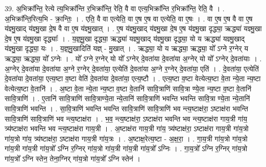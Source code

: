 \documentclass[17pt]{extarticle}
\begin{document}
39. अ॒भिक्रा᳚न्ति॒ रेत्ये त्य॒भिक्रा᳚न्ति र॒भिक्रा᳚न्ति॒ रेति॒ वै वा एत्य॒भिक्रा᳚न्ति र॒भिक्रा᳚न्ति॒ रेति॒ वै । . अ॒भिक्रा᳚न्ति॒रित्य॒भि - क्रा॒न्तिः॒ । . एति॒ वै वा एत्येति॒ वा ए॒ष ए॒ष वा एत्येति॒ वा ए॒षः । . वा ए॒ष ए॒ष वै वा ए॒ष य॑ज्ञ्मु॒खाद् य॑ज्ञ्मु॒खा दे॒ष वै वा ए॒ष य॑ज्ञ्मु॒खात् । . ए॒ष य॑ज्ञ्मु॒खाद् य॑ज्ञ्मु॒खा दे॒ष ए॒ष य॑ज्ञ्मु॒खा दृद्ध्या॒ ऋद्ध्या॑ यज्ञ्मु॒खा दे॒ष ए॒ष य॑ज्ञ्मु॒खा दृद्ध्याः᳚ । . य॒ज्ञ्॒मु॒खा दृद्ध्या॒ ऋद्ध्या॑ यज्ञ्मु॒खाद् य॑ज्ञ्मु॒खा दृद्ध्या॒ यो य ऋद्ध्या॑ यज्ञ्मु॒खाद् य॑ज्ञ्मु॒खा दृद्ध्या॒ यः । . य॒ज्ञ्॒मु॒खादिति॑ यज्ञ् - मु॒खात् । . ऋद्ध्या॒ यो य ऋद्ध्या॒ ऋद्ध्या॒ यो᳚ ऽग्ने र॒ग्नेर् य ऋद्ध्या॒ ऋद्ध्या॒ यो᳚ ऽग्नेः । . यो᳚ ऽग्ने र॒ग्नेर् यो यो᳚ ऽग्नेर् दे॒वता॑या दे॒वता॑या अ॒ग्नेर् यो यो᳚ ऽग्नेर् दे॒वता॑याः । . अ॒ग्नेर् दे॒वता॑या दे॒वता॑या अ॒ग्ने र॒ग्नेर् दे॒वता॑या॒ एत्येति॑ दे॒वता॑या अ॒ग्ने र॒ग्नेर् दे॒वता॑या॒ एति॑ । . दे॒वता॑या॒ एत्येति॑ दे॒वता॑या दे॒वता॑या॒ एत्य॒ष्टा व॒ष्टा वेति॑ दे॒वता॑या दे॒वता॑या॒ एत्य॒ष्टौ । . एत्य॒ष्टा व॒ष्टा वेत्येत्य॒ष्टा वे॒ता न्ये॒ता न्य॒ष्टा वेत्येत्य॒ष्टा वे॒तानि॑ । . अ॒ष्टा वे॒ता न्ये॒ता न्य॒ष्टा व॒ष्टा वे॒तानि॑ सावि॒त्राणि॑ सावि॒त्रा ण्ये॒ता न्य॒ष्टा व॒ष्टा वे॒तानि॑ सावि॒त्राणि॑ । . ए॒तानि॑ सावि॒त्राणि॑ सावि॒त्राण्ये॒ता न्ये॒तानि॑ सावि॒त्राणि॑ भवन्ति भवन्ति सावि॒त्रा ण्ये॒ता न्ये॒तानि॑ सावि॒त्राणि॑ भवन्ति । . सा॒वि॒त्राणि॑ भवन्ति भवन्ति सावि॒त्राणि॑ सावि॒त्राणि॑ भव न्त्य॒ष्टाक्ष॑रा॒ ऽष्टाक्ष॑रा भवन्ति सावि॒त्राणि॑ सावि॒त्राणि॑ भव न्त्य॒ष्टाक्ष॑रा । . भ॒व॒ न्त्य॒ष्टाक्ष॑रा॒ ऽष्टाक्ष॑रा भवन्ति भव न्त्य॒ष्टाक्ष॑रा गाय॒त्री गा॑य॒ त्र्य॑ष्टाक्ष॑रा भवन्ति भव न्त्य॒ष्टाक्ष॑रा गाय॒त्री । . अ॒ष्टाक्ष॑रा गाय॒त्री गा॑य॒ त्र्य॑ष्टाक्ष॑रा॒ ऽष्टाक्ष॑रा गाय॒त्री गा॑य॒त्रो गा॑य॒त्रो गा॑य॒ त्र्य॑ष्टाक्ष॑रा॒ ऽष्टाक्ष॑रा गाय॒त्री गा॑य॒त्रः । . अ॒ष्टाक्ष॒रेत्य॒ष्टा - अ॒क्ष॒रा॒ । . गा॒य॒त्री गा॑य॒त्रो गा॑य॒त्रो गा॑य॒त्री गा॑य॒त्री गा॑य॒त्रो᳚ ऽग्नि र॒ग्निर् गा॑य॒त्रो गा॑य॒त्री गा॑य॒त्री गा॑य॒त्रो᳚ ऽग्निः । . गा॒य॒त्रो᳚ ऽग्नि र॒ग्निर् गा॑य॒त्रो गा॑य॒त्रो᳚ ऽग्नि स्तेन॒ तेना॒ग्निर् गा॑य॒त्रो गा॑य॒त्रो᳚ ऽग्नि स्तेन॑ । \newline
\pagebreak
{}
\end{document}
